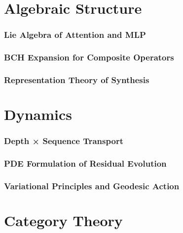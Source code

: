 \documentclass[11pt]{article}
\begin{document}
\part{Algebraic Structure}

\section{Lie Algebra of Attention and MLP}

\section{BCH Expansion for Composite Operators}

\section{Representation Theory of Synthesis}

\part{Dynamics}

\section{Depth × Sequence Transport}

\section{PDE Formulation of Residual Evolution}

\section{Variational Principles and Geodesic Action}

\part{Category Theory}
\end{document}
